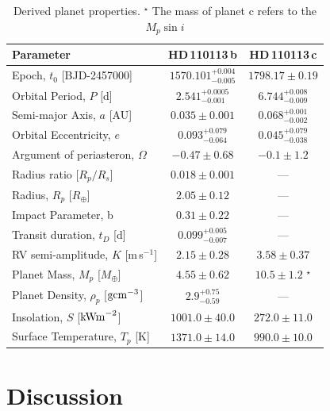 \documentclass[fleqn,usenatbib]{mnras}
\newcommand{\ms}{m\,s$^{-1}$}
\newcommand{\Ttzerozero}{ $ 1570.101^{+0.004}_{-0.005} $ }
\newcommand{\Ttzeroone}{ $ 1798.17 \pm 0.19 $ }
\newcommand{\TKzero}{ $ 2.15 \pm 0.28 $ }
\newcommand{\TKone}{ $ 3.58 \pm 0.37 $ }
\newcommand{\TPzero}{ $ 2.541^{+0.0005}_{-0.001} $ }
\newcommand{\TPone}{ $ 6.744^{+0.008}_{-0.009} $ }
\newcommand{\Tecczero}{ $ 0.093^{+0.079}_{-0.064} $ }
\newcommand{\Teccone}{ $ 0.045^{+0.079}_{-0.038} $ }
\newcommand{\Tomegazero}{ $ -0.47 \pm 0.68 $ }
\newcommand{\Tomegaone}{ $ -0.1 \pm 1.2 $ }
\newcommand{\TMpzero}{ $ 4.55 \pm 0.62 $ }
\newcommand{\TMpone}{ $ 10.5 \pm 1.2 $ }
\newcommand{\Tror}{ $ 0.018 \pm 0.001 $ }
\newcommand{\Trpl}{ $ 2.05 \pm 0.12 $ }
\newcommand{\Tb}{ $ 0.31 \pm 0.22 $ }
\newcommand{\Trhopgcmthree}{ $ 2.9^{+0.75}_{-0.59} $ }
\newcommand{\Tsmazero}{ $ 0.035 \pm 0.001 $ }
\newcommand{\Tsmaone}{ $ 0.068^{+0.001}_{-0.002} $ }
\newcommand{\TSinzero}{ $ 1001.0 \pm 40.0 $ }
\newcommand{\TSinone}{ $ 272.0 \pm 11.0 $ }
\newcommand{\TTsurfpzero}{ $ 1371.0 \pm 14.0 $ }
\newcommand{\TTsurfpone}{ $ 990.0 \pm 10.0 $ }
\newcommand{\Ttdurzero}{ $ 0.099^{+0.005}_{-0.007} $ }
\newcommand{\Tplanet}{HD\,110113\,b}
\newcommand{\Tplanetc}{HD\,110113\,c}
\begin{document}
\begin{table}
	\centering
	\label{tab:derived_pars}
        \begin{tabular}{lcc}
        \hline
        \hline
        Parameter & \Tplanet{} & \Tplanetc{}\\
        \hline
        \hline
        Epoch, $t_0$ [BJD-2457000] &  \Ttzerozero{}  &  \Ttzeroone  \\
        Orbital Period, $P$ [d] &  \TPzero{}  &  \TPone{} \\
        Semi-major Axis, $a$ [AU] &  \Tsmazero{}  &  \Tsmaone{}  \\
        Orbital Eccentricity, $e$ &  \Tecczero{}  & \Teccone{}  \\
        Argument of periasteron, $\Omega$ &  \Tomegazero{} &  \Tomegaone{}  \\
        Radius ratio [$R_p/R_s$] &  \Tror{}  & --- \\
        Radius, $R_p$ [$R_\oplus$] &  \Trpl{}  & --- \\
        Impact Parameter, b &  \Tb{}  & --- \\
        Transit duration, $t_D$ [d] &  \Ttdurzero{}  & --- \\
        RV semi-amplitude, $K$ [\ms{}] &  \TKzero{}  &  \TKone{}  \\
        Planet Mass, $M_p$ [$M_\oplus$] &  \TMpzero{}  &  \TMpone{}$^{\star}$  \\
        Planet Density, $\rho_p$ [${\rm gcm}^{-3}$] &  \Trhopgcmthree{}  & --- \\
        Insolation, $S$ [${\rm kW m}^{-2}$] &  \TSinzero{} &  \TSinone{} \\
        Surface Temperature, $T_p$ [K] & \TTsurfpzero{}  &  \TTsurfpone{} \\
        \hline
        \hline
        \end{tabular}
	\caption{Derived planet properties. $^{\star}$ The mass of planet c refers to the $M_p\sin{i}$}
\end{table}

\section{Discussion}\label{sect:discus}
\end{document}
